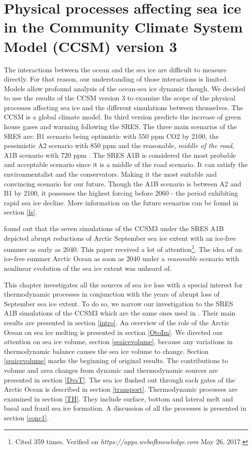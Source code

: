 \section{Physical processes affecting sea ice in the Community Climate System Model (CCSM) version 3}\label{processes}

The interactions between the ocean and the sea ice are difficult to measure directly. For that reason, our understanding of those interactions is limited. Models allow profound analysis of the ocean-sea ice dynamic though. We decided to use the results of the CCSM version 3 to examine the scope of the physical processes affecting sea ice and the different simulations between themselves. The CCSM is a global climate model. Its third version predicts the increase of green house gases and warming following the SRES. The three main scenarios of the SRES are: B1 scenario being optimistic with $550$ ppm CO2 by 2100, the pessimistic A2 scenario with $850$ ppm and the reasonable, \textit{middle of the road},  A1B scenario with $720$ ppm \citep{IPCC4}. The SRES A1B is considered the most probable and acceptable scenario since it is a middle of the road scenario. It can satisfy the environmentalist and the conservators. Making it the most suitable and convincing scenario for our future. Though the A1B scenario is between A2 and B1 by 2100, it possesses the highest forcing before 2060 - the period exhibiting rapid sea ice decline. More information on the future scenarios can be found in section \ref{fs}.

\cite{ISI:000242942100008} found out that the seven simulations of the CCSM3 under the SRES A1B depicted abrupt reductions of Arctic September sea ice extent with an ice-free summer as early as 2040. This paper received a lot of attention\footnote{Cited 359 times. Verified on \textit{https://apps.webofknowledge.com} May 26, 2017.}. The idea of an ice-free summer Arctic Ocean as soon as 2040 under a \textit{reasonable} scenario with nonlinear evolution of the sea ice extent was unheard of. 

This chapter investigates all the sources of sea ice loss with a special interest for thermodynamic processes in conjunction with the years of abrupt loss of September sea ice extent. To do so, we narrow our investigation to the SRES A1B simulations of the CCSM3 which are the same ones used in \cite{ISI:000242942100008}. Their main results are presented in section \ref{intro}. An overview of the role of the Arctic Ocean on sea ice melting is presented in section \ref{OtoIm}. We directed our attention on sea ice volume, section \ref{seaicevolume}, because any variations in thermodynamic balance causes the sea ice volume to change. Section \ref{seaicevolume} marks the beginning of original results. The contributions to volume and area changes from dynamic and thermodynamic sources are presented in section \ref{DvsT}. The sea ice flushed out through each gates of the Arctic Ocean is described in section \ref{transport}. Thermodynamic processes are examined in section \ref{TH}. They include surface, bottom and lateral melt and basal and frazil sea ice formation. A discussion of all the processes is presented in section \ref{conc1}. 

